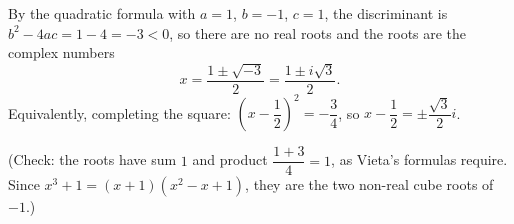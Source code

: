 By the quadratic formula with $a=1$, $b=-1$, $c=1$, the discriminant is $b^2-4ac=1-4=-3<0$, so there are no real roots and the roots are the complex numbers
\[
x=\dfrac{1\pm\sqrt{-3}}{2}=\boxed{\dfrac{1\pm i\sqrt3}{2}}.
\]
Equivalently, completing the square: $\left(x-\dfrac{1}{2}\right)^2=-\dfrac{3}{4}$, so $x-\dfrac{1}{2}=\pm\dfrac{\sqrt3}{2}i$.

(Check: the roots have sum $1$ and product $\dfrac{1+3}{4}=1$, as Vieta's formulas require. Since $x^3+1=(x+1)(x^2-x+1)$, they are the two non-real cube roots of $-1$.)

